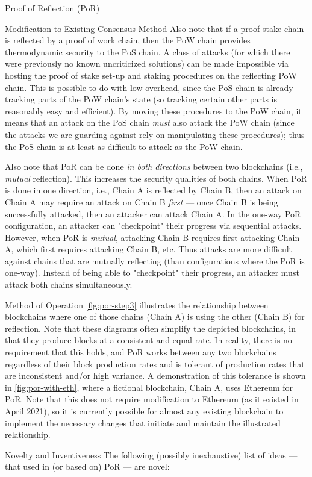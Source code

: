 \begin{section}{Proof of Reflection (PoR)}
\begin{subsection}{Modification to Existing Consensus Method}
     Also note that if a proof stake chain is reflected by a proof of work chain, then the PoW chain provides thermodynamic security to the PoS chain. A class of attacks (for which there were previously no known uncriticized solutions) can be made impossible via hosting the proof of stake set-up and staking procedures on the reflecting PoW chain. This is possible to do with low overhead, since the PoS chain is already tracking parts of the PoW chain's state (so tracking certain other parts is reasonably easy and efficient). By moving these procedures to the PoW chain, it means that an attack on the PoS chain \emph{must} also attack the PoW chain (since the attacks we are guarding against rely on manipulating these procedures); thus the PoS chain is at least as difficult to attack as the PoW chain.

     Also note that PoR can be done \emph{in both directions} between two blockchains (i.e., \emph{mutual} reflection). This increases the security qualities of both chains. When PoR is done in one direction, i.e., Chain A is reflected by Chain B, then an attack on Chain A may require an attack on Chain B \emph{first} --- once Chain B is being successfully attacked, then an attacker can attack Chain A. In the one-way PoR configuration, an attacker can "checkpoint" their progress via sequential attacks. However, when PoR is \emph{mutual}, attacking Chain B requires first attacking Chain A, which first requires attacking Chain B, etc. Thus attacks are more difficult against chains that are mutually reflecting (than configurations where the PoR is one-way). Instead of being able to "checkpoint" their progress, an attacker must attack both chains simultaneously.

 \end{subsection}
 \begin{subsection}{Method of Operation}
     \autoref{fig:por-step3} illustrates the relationship between blockchains where one of those chains (Chain A) is using the other (Chain B) for reflection.
     Note that these diagrams often simplify the depicted blockchains, in that they produce blocks at a consistent and equal rate.
     In reality, there is no requirement that this holds, and PoR works between any two blockchains regardless of their block production rates and is tolerant of production rates that are inconsistent and/or high variance.
     A demonstration of this tolerance is shown in \autoref{fig:por-with-eth}, where a fictional blockchain, Chain A, uses Ethereum for PoR.
     Note that this does not require modification to Ethereum (as it existed in April 2021), so it is currently possible for almost any existing blockchain to implement the necessary changes that initiate and maintain the illustrated relationship.
 \end{subsection}
 \begin{subsection}{Novelty and Inventiveness}
     The following (possibly inexhaustive) list of ideas --- that used in (or based on) PoR --- are novel:


\end{subsection}
\end{section}
